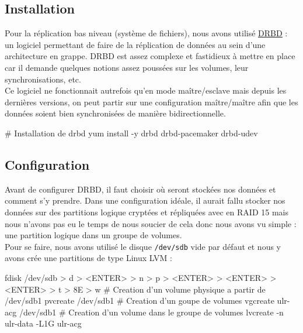 \documentclass[11pt,a4paper]{report}
\begin{document}
            \subsection{Installation}
                
                Pour la r\'eplication bas niveau (syst\`eme de fichiers), nous avons utilis\'e \underline{\href{http://www.drbd.org/}{DRBD}} : un logiciel permettant de faire de la r\'eplication de donn\'ees au sein d'une architecture en grappe. DRBD est assez complexe et fastidieux \`a mettre en place car il demande quelques notions assez pouss\'ees sur les volumes, leur synchronisations, etc.\\
                
                Ce logiciel ne fonctionnait autrefois qu'en mode ma\^itre/esclave mais depuis les derni\`eres versions, on peut partir sur une configuration ma\^itre/ma\^itre afin que les donn\'ees soient bien synchronis\'ees de mani\`ere bidirectionnelle.\\
                
                \begin{bashcode}
                    # Installation de drbd
                    yum install -y drbd drbd-pacemaker drbd-udev
                \end{bashcode}
                
            \subsection{Configuration}
                
                Avant de configurer DRBD, il faut choisir o\`u seront stock\'ees nos donn\'ees et comment s'y prendre. Dans une configuration id\'eale, il aurait fallu stocker nos donn\'ees sur des partitions logique crypt\'ees et r\'epliqu\'ees avec en RAID 15 mais nous n'avons pas eu le temps de nous soucier de cela donc nous avons vu simple : une partition logique dans un groupe de volumes.\\
                
                Pour se faire, nous avons utilis\'e le disque \verb+/dev/sdb+ vide par d\'efaut et nous y avons cr\'ee une partitions de type Linux LVM :\\
                
                \begin{bashcode}
                    fdisk /dev/sdb
                    > d
                    > <ENTER>
                    > n
                    > p
                    > <ENTER>
                    > <ENTER>
                    > <ENTER>
                    > t
                    > 8E
                    > w
                    # Creation d'un volume physique a partir de /dev/sdb1
                    pvcreate /dev/sdb1
                    # Creation d'un goupe de volumes
                    vgcreate ulr-acg /dev/sdb1
                    # Creation d'un volume dans le groupe de volumes
                    lvcreate -n ulr-data -L1G ulr-acg
                \end{bashcode}
                
\end{document}
